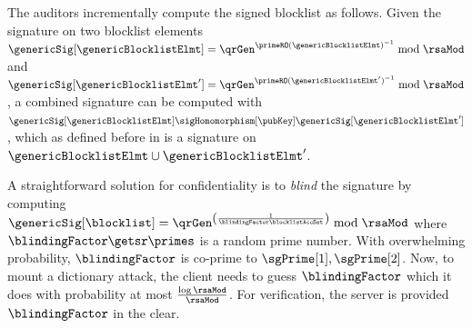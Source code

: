 The auditors incrementally compute the signed blocklist as follows. Given the signature on two 
blocklist elements $\genericSig[\genericBlocklistElmt] = 
\qrGen^{\primeRO(\genericBlocklistElmt)^{-1}} \bmod \rsaMod$ and 
$\genericSig[\genericBlocklistElmt'] = \qrGen^{\primeRO(\genericBlocklistElmt')^{-1}} \bmod 
\rsaMod$, a combined signature can be computed with $\genericSig[\genericBlocklistElmt] 
\sigHomomorphism[\pubKey] \genericSig[\genericBlocklistElmt']$, which as defined before in 
 is a signature on $\genericBlocklistElmt \cup 
\genericBlocklistElmt'$.  


%
A straightforward solution for confidentiality is to \textit{blind} the signature by computing 
$\genericSig[\blocklist] =  \qrGen^{\left(\frac{1}{\blindingFactor \blocklistAccSet}\right)} \bmod 
\rsaMod$ where $\blindingFactor \getsr \primes$ is a random prime number. With overwhelming 
probability, $\blindingFactor$ is co-prime to $\sgPrime[1],  
\sgPrime[2]$. Now, to mount a dictionary attack, the client needs to guess $\blindingFactor$
which it does with probability at most $\frac{\log \rsaMod}{\rsaMod}$. For verification, the server is 
provided $\blindingFactor$ in the clear. 
\fi
